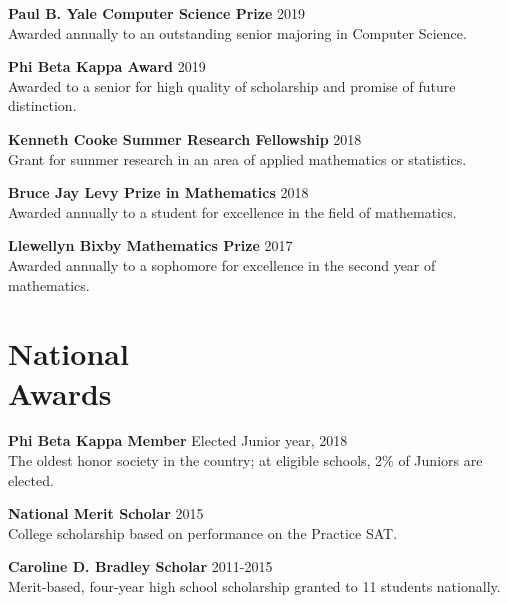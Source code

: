 \documentclass[margin]{res}
\begin{document}
\begin{resume}
\textbf{Paul B. Yale Computer Science Prize} \hfill 2019\\
Awarded annually to an outstanding senior majoring in Computer Science.

\textbf{Phi Beta Kappa Award} \hfill 2019\\
Awarded to a senior for high quality of scholarship and promise of future distinction.

\textbf{Kenneth Cooke Summer Research Fellowship} \hfill 2018\\
Grant for summer research in an area of applied mathematics or statistics.

\textbf{Bruce Jay Levy Prize in Mathematics} \hfill 2018\\
Awarded annually to a student for excellence in the field of mathematics.

\textbf{Llewellyn Bixby Mathematics Prize} \hfill 2017\\
Awarded annually to a sophomore for excellence in the second year of mathematics.

\section{National \\Awards}
\textbf{Phi Beta Kappa Member} \hfill Elected Junior year, 2018\\
The oldest honor society in the country; at eligible schools, 2\% of Juniors are elected.

\textbf{National Merit Scholar} \hfill 2015\\
College scholarship based on performance on the Practice SAT.

\textbf{Caroline D. Bradley Scholar} \hfill 2011-2015\\
Merit-based, four-year high school scholarship granted to 11 students nationally.

\end{resume}
\end{document}
